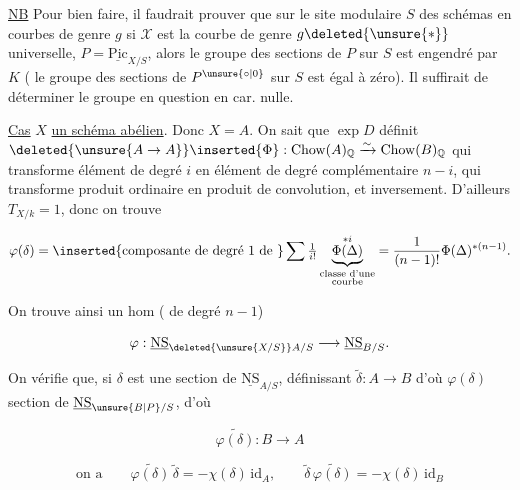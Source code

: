 
\uline{NB} Pour bien faire, il faudrait prouver que sur le site modulaire $S$ des schémas en courbes  de genre $g$   si $\mathcal X$ est la courbe de genre $g\deleted{\unsure{*}}$ universelle, $P=\underline{\mathrm{Pic}}_{X/S}$, alors le groupe des sections de $P$ sur $S$ est engendré par $K$ (  le groupe des sections de $P^{\unsure{\circ|0}}$ sur $S$ est égal à zéro). Il suffirait de déterminer le groupe en question en car. nulle.

  \uline{Cas} $X$ \uline{un schéma abélien}. Donc $X=A$. On sait que  $\exp D$ définit $\deleted{\unsure{A\to A}}\inserted{\Phi}:\mathrm{Chow}(A)_{\mathbb Q}\xrightarrow{\sim}\mathrm{Chow}(B)_{\mathbb Q}$ qui  transforme élément de degré $i$ en élément de degré complémentaire $n-i$,  qui transforme produit ordinaire en produit de convolution, et inversement. D'ailleurs $T_{X/k}=1$, donc on trouve

\[
\varphi(\delta)=\inserted{\text{composante de degré 1 de }}\sum\tfrac1{i!}\underbrace{\Phi(\Delta)}_{\substack{\text{classe d'une}\\\text{courbe}}}^{*i}
=\frac1{(n-1)!}\Phi(\Delta)^{*(n-1)}.
\]

 On trouve ainsi un hom ( de degré $n-1$)

\[
\varphi:\underline{\mathrm{NS}}_{\deleted{\unsure{X/S}}A/S}\longrightarrow\underline{\mathrm{NS}}_{B/S}.
\]

On vérifie que, si $\delta$ est une section de $\underline{\mathrm{NS}}_{A/S}$, définissant $\widetilde\delta:A\longrightarrow B$ d'où $\varphi(\delta)$ section de $\underline{\mathrm{NS}}_{\unsure{B|P}/S}$, d'où

\[
\widetilde{\varphi(\delta)}:B\longrightarrow A
\]


\[
\text{on a}\qquad\boxed{\widetilde{\varphi(\delta)}\,\widetilde\delta=-\chi(\delta)\,\mathrm{id}_A,\qquad\widetilde\delta\,\widetilde{\varphi(\delta)}=-\chi(\delta)\,\mathrm{id}_B}
\]
